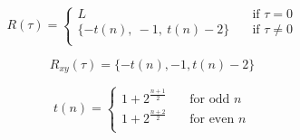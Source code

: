 		\begin{equation}
			\label{eq:autocorr-gold}
			R(\tau) = 
				\begin{cases}
					L    							& \quad \text{if } \tau = 0 \\
					\{ -t(n), \ -1, \ t(n) - 2  \} 	& \quad \text{if } \tau \neq 0 \\
				\end{cases}
		\end{equation}

		\begin{equation}
			\label{eq:corsscorr-gold}
			R_{xy}(\tau) = 	\{ -t(n), -1, t(n) - 2  \} 
		\end{equation}

		\begin{equation}
			\label{eq:gold-t(n)}
			t(n) = 
				\begin{cases}
					1 + 2^{\frac{n+1}{2}} & \quad \text{for odd } n \\
					1 + 2^{\frac{n+2}{2}} & \quad \text{for even } n \\
				\end{cases}
		\end{equation}

		



